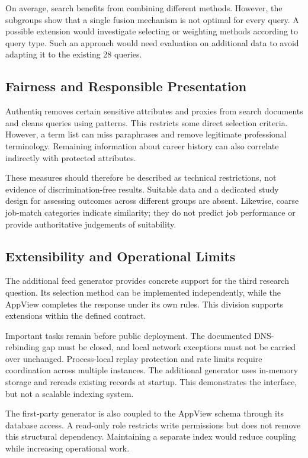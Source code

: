 \documentclass[11pt,a4paper]{article}
\begin{document}
On average, search benefits from combining different methods. However, the subgroups show that a single fusion mechanism is not optimal for every query. A possible extension would investigate selecting or weighting methods according to query type. Such an approach would need evaluation on additional data to avoid adapting it to the existing 28 queries.

\subsection{Fairness and Responsible Presentation}

Authentiq removes certain sensitive attributes and proxies from search documents and cleans queries using patterns. This restricts some direct selection criteria. However, a term list can miss paraphrases and remove legitimate professional terminology. Remaining information about career history can also correlate indirectly with protected attributes.

These measures should therefore be described as technical restrictions, not evidence of discrimination-free results. Suitable data and a dedicated study design for assessing outcomes across different groups are absent. Likewise, coarse job-match categories indicate similarity; they do not predict job performance or provide authoritative judgements of suitability.

\subsection{Extensibility and Operational Limits}

The additional feed generator provides concrete support for the third research question. Its selection method can be implemented independently, while the AppView completes the response under its own rules. This division supports extensions within the defined contract.

Important tasks remain before public deployment. The documented DNS-rebinding gap must be closed, and local network exceptions must not be carried over unchanged. Process-local replay protection and rate limits require coordination across multiple instances. The additional generator uses in-memory storage and rereads existing records at startup. This demonstrates the interface, but not a scalable indexing system.

The first-party generator is also coupled to the AppView schema through its database access. A read-only role restricts write permissions but does not remove this structural dependency. Maintaining a separate index would reduce coupling while increasing operational work.
\end{document}
